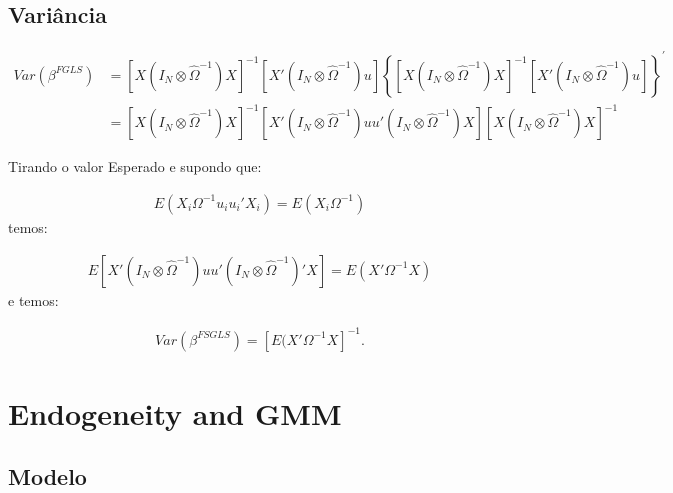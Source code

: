 \documentclass[11pt,oneside,a4paper]{article}
\numberwithin{equation}{section}
\begin{document}
\subsection*{Variância}

\vspace{-1 em}
\begin{align*}
Var(\beta^{FGLS})
&= 
\left[ X \left( I_{N} \otimes \widehat{\Omega}^{-1} \right) X \right]^{-1}
\left[ X' \left( I_{N} \otimes \widehat{\Omega}^{-1} \right) u \right]
\left\{ 
\left[ X \left( I_{N} \otimes \widehat{\Omega}^{-1} \right) X \right]^{-1}
\left[ X' \left( I_{N} \otimes \widehat{\Omega}^{-1} \right) u \right]
\right\}^{\prime}
\\
&=
\left[ X \left( I_{N} \otimes \widehat{\Omega}^{-1} \right) X \right]^{-1}
\left[
X' \left( I_{N} \otimes \widehat{\Omega}^{-1} \right) 
u u'
\left( I_{N} \otimes \widehat{\Omega}^{-1} \right) X
\right]
\left[ X \left( I_{N} \otimes \widehat{\Omega}^{-1} \right) X \right]^{-1}
\end{align*}

Tirando o valor Esperado e supondo que:

\vspace{-1.5 em}
\begin{align*}
E(X_{i} \Omega^{-1} u_{i} u_{i}' X_{i}) = E(X_{i} \Omega^{-1})
\end{align*}
temos:

\vspace{-1.5 em}
\begin{align*}
E\left[ X' \left( I_{N} \otimes \widehat{\Omega}^{-1} \right)
	u u'
\left( I_{N} \otimes \widehat{\Omega}^{-1} \right)' X \right]
=
E(X' \Omega^{-1} X)
\end{align*}
e temos:

\vspace{-1.5 em}
\begin{align*}
	Var(\beta^{FSGLS}) = \left[ E(X' \Omega^{-1} X \right]^{-1}.
\end{align*}

\clearpage
\section{Endogeneity and GMM}


\subsection*{Modelo}
\end{document}
